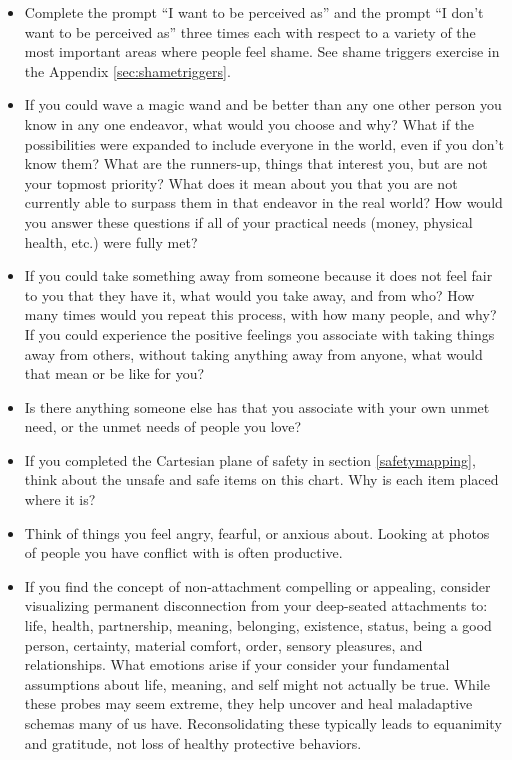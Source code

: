 \documentclass[12pt,letterpaper]{article}
\begin{document}
\begin{itemize}
    \item Complete the prompt “I want to be perceived as” and the prompt “I don't want to be perceived as” three times each with respect to a variety of the most important areas where people feel shame. See shame triggers exercise in the Appendix \ref{sec:shametriggers}.
    \item If you could wave a magic wand and be better than any one other person you know in any one endeavor, what would you choose and why? What if the possibilities were expanded to include everyone in the world, even if you don't know them? What are the runners-up, things that interest you, but are not your topmost priority? What does it mean about you that you are not currently able to surpass them in that endeavor in the real world? How would you answer these questions if all of your practical needs (money, physical health, etc.) were fully met?
    \item If you could take something away from someone because it does not feel fair to you that they have it, what would you take away, and from who? How many times would you repeat this process, with how many people, and why? If you could experience the positive feelings you associate with taking things away from others, without taking anything away from anyone, what would that mean or be like for you?
    \item Is there anything someone else has that you associate with your own unmet need, or the unmet needs of people you love?
    \item If you completed the Cartesian plane of safety in section \ref{safetymapping}, think about the unsafe and safe items on this chart. Why is each item placed where it is?
    \item Think of things you feel angry, fearful, or anxious about. Looking at photos of people you have conflict with is often productive.
    \item If you find the concept of non-attachment compelling or appealing, consider visualizing permanent disconnection from your deep-seated attachments to: life, health, partnership, meaning, belonging, existence, status, being a good person, certainty, material comfort, order, sensory pleasures, and relationships. What emotions arise if your consider your fundamental assumptions about life, meaning, and self might not actually be true. While these probes may seem extreme, they help uncover and heal maladaptive schemas many of us have. Reconsolidating these typically leads to equanimity and gratitude, not loss of healthy protective behaviors.

\end{itemize}
\end{document}
